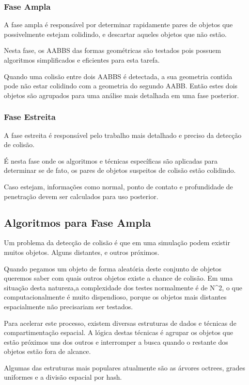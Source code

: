 \subsubsection{Fase Ampla}
A fase ampla é responsável por determinar rapidamente pares de objetos que
possivelmente estejam colidindo, e descartar aqueles objetos que não estão.

Nesta fase, os AABBS das formas geométricas são testados pois possuem
algoritmos simplificados e eficientes para esta tarefa.

Quando uma colisão entre dois AABBS é detectada, a sua geometria contida pode
não estar colidindo com a geometria do segundo AABB. Então estes dois objetos
são agrupados para uma análise mais detalhada em uma fase posterior.

\subsubsection{Fase Estreita}
A fase estreita é responsável pelo trabalho mais detalhado e preciso da
detecção de colisão.

É nesta fase onde os algoritmos e técnicas específicas são
aplicadas para determinar se de fato, os pares de objetos suspeitos de colisão
estão colidindo.

Caso estejam, informações como normal, ponto de contato e profundidade de
penetração devem ser calculados para uso posterior.

\subsection{Algoritmos para Fase Ampla}
Um problema da detecção de colisão é que em uma simulação podem existir muitos
objetos. Alguns distantes, e outros próximos.

Quando pegamos um objeto de forma aleatória deste conjunto de objetos queremos saber com quais outros objetos
existe a chance de colisão.
Em uma situação desta natureza,a complexidade dos testes normalmente é de N^2, o que
computacionalmente é muito dispendioso, porque os objetos mais distantes
espacialmente não precisariam ser testados.

Para acelerar este processo, existem diversas estruturas de dados e técnicas de compartimentação espacial.
A lógica destas técnicas é agrupar os objetos que estão próximos uns dos outros
e interromper a busca quando o restante dos objetos estão fora de alcance.

Algumas das estruturas mais populares atualmente são as árvores octrees, grades
uniformes e a divisão espacial por hash.

